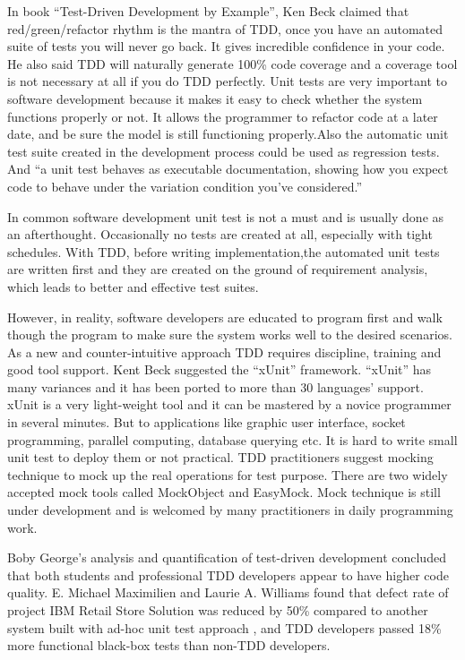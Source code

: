 In book ``Test-Driven Development by Example'', Ken Beck claimed that
red/green/refactor rhythm is the mantra of TDD, once you have an automated
suite of tests you will never go back. It gives incredible confidence in
your code. He also said TDD will naturally generate 100\% code coverage and a
coverage tool is not necessary at all if you do TDD perfectly.
Unit tests are very important to software development because it makes it
easy to check whether the system functions properly or not. It allows the
programmer to refactor code at a later date, and be sure the model is still
functioning properly\cite{UnitTest}.Also the automatic unit test suite created
in the development process could be used as regression tests. And ``a unit
test behaves as executable documentation, showing how you expect code to
behave under the variation condition you've considered.''\cite{Andy&Dave_2003}

In common software development unit test is not a must and is usually done
as an afterthought. Occasionally no tests are created at all, especially
with tight schedules. With TDD, before writing implementation,the automated
unit tests are written first and they are created on the ground of
requirement analysis, which leads to better and effective test suites.
  
However, in reality, software developers are educated to program first and
walk though the program to make sure the system works well to the desired
scenarios. As a new and counter-intuitive approach TDD requires discipline,
training and good tool support. Kent Beck suggested the ``xUnit''
framework. ``xUnit'' has many variances and it has been ported to more than
30 languages' support\cite{XPSoftware}. xUnit is a very light-weight tool
and it can be mastered by a novice programmer in several minutes. But to
applications like graphic user interface, socket programming, parallel
computing, database querying etc. It is hard to write small unit test to
deploy them or not practical. TDD practitioners suggest mocking technique
to mock up the real operations for test purpose. There are two widely
accepted mock tools called MockObject and EasyMock. Mock technique is
still under development and is welcomed by many practitioners in daily
programming work.

Boby George's analysis and quantification of test-driven development
concluded that both students and professional TDD developers appear to have
higher code quality\cite{George_2002}. E. Michael Maximilien and Laurie
A. Williams found that defect rate of project IBM Retail Store
Solution was reduced by 50\% compared to another system built with ad-hoc
unit test approach \cite{Maximilien_2003}, and TDD developers passed 18\% more
functional black-box tests than non-TDD developers. 











